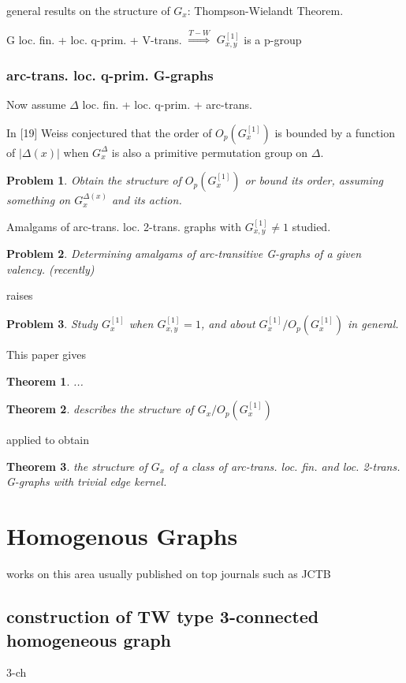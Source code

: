 \documentclass[a4paper,11pt,openany]{book}
\newtheorem{theorem}{Theorem}[section]
\newtheorem{problem}{Problem}[section]
\begin{document}
general results on the structure of $G_x$: Thompson-Wielandt Theorem.

\centerline{
G loc. fin. + loc. q-prim. + V-trans. $\mathop{\Longrightarrow}\limits^{T-W}$ $G_{x,y}^{[1]}$ is a p-group}

\subsection{arc-trans. loc. q-prim. G-graphs}

Now assume $\Delta$ loc. fin. + loc. q-prim. + arc-trans.


In [19] Weiss conjectured that the order of $O_p(G_x^{[1]})$ is bounded by a function of $|\Delta(x)|$ when $G_x^\Delta$ is also a primitive permutation group on $\Delta$.

\begin{problem}
	Obtain the structure of $O_p(G_x^{[1]})$ or bound its order, assuming something on $G_x^{\Delta(x)}$ and its action.
\end{problem}

Amalgams of arc-trans. loc. 2-trans. graphs with $G_{x,y}^{[1]}\neq 1$ studied.

\begin{problem}
	Determining amalgams of arc-transitive G-graphs of a given valency. (recently)
\end{problem}

raises
\begin{problem}
	Study $G_x^{[1]}$ when $G_{x,y}^{[1]}= 1$, and about $G_x^{[1]}/O_p(G_x^{[1]})$ in general.
\end{problem}

This paper gives
\begin{theorem}
	...
\end{theorem}
\begin{theorem}
	describes the structure of $G_x/O_p(G_x^{[1]})$
\end{theorem}
applied to obtain 
\begin{theorem}
	the structure of $G_x$ of a class of arc-trans. loc. fin. and loc. 2-trans. G-graphs with trivial edge kernel.
\end{theorem}


\chapter{Homogenous Graphs}
works on this area usually published on top journals such as JCTB
\section{construction of TW type 3-connected homogeneous graph}
3-ch
\end{document}
